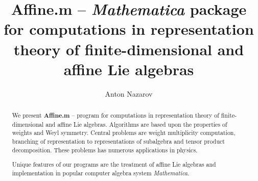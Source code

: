 \documentclass[preprint,12pt]{elsarticle}
\begin{document}
\begin{frontmatter}



\title{{\bf Affine.m} -- {\it Mathematica} package for computations in representation theory of finite-dimensional and affine Lie algebras}


\author[a,b]{Anton Nazarov}

\address[a]{Department of High Energy Physics, Faculty of physics, SPb State University\\ 198904, Sankt-Petersburg, Russia}
\address[b]{Chebyshev Laboratory, Faculty of Mathematics and Mechanics, SPb State University\\ 199178, Saint-Petersburg, Russia}

\begin{abstract}
We present {\bf Affine.m} -- program for computations in representation theory of finite-dimensional and affine Lie algebras. Algorithms are based upon the properties of weights and Weyl symmetry. Central problems are weight multiplicity computation, branching of representation to representations of subalgebra and tensor product decomposition. These problems has numerous applications in physics.

Unique features of our programs are the treatment of affine Lie algebras and implementation in popular computer algebra system {\it Mathematica}.


\end{abstract}
\end{frontmatter}
\end{document}

